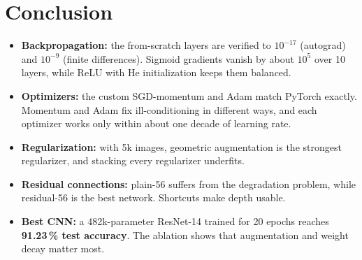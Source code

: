 \documentclass[11pt,a4paper]{article}
\begin{document}
\section*{Conclusion}
\begin{itemize}
  \item \textbf{Backpropagation:} the from-scratch layers are verified to $10^{-17}$ (autograd) and $10^{-9}$ (finite differences). Sigmoid gradients vanish by about $10^5$ over 10 layers, while ReLU with He initialization keeps them balanced.
  \item \textbf{Optimizers:} the custom SGD-momentum and Adam match PyTorch exactly. Momentum and Adam fix ill-conditioning in different ways, and each optimizer works only within about one decade of learning rate.
  \item \textbf{Regularization:} with 5k images, geometric augmentation is the strongest regularizer, and stacking every regularizer underfits.
  \item \textbf{Residual connections:} plain-56 suffers from the degradation problem, while residual-56 is the best network. Shortcuts make depth usable.
  \item \textbf{Best CNN:} a 482k-parameter ResNet-14 trained for 20 epochs reaches \textbf{91.23\,\% test accuracy}. The ablation shows that augmentation and weight decay matter most.
\end{itemize}
\end{document}
